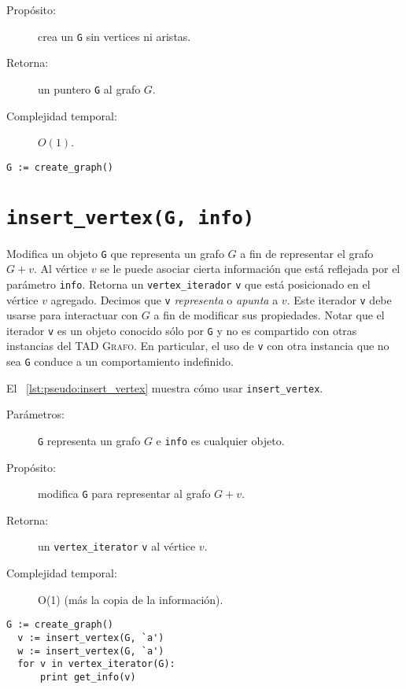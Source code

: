 \documentclass[%
    a4paper,%
    fontsize=12pt,%
    DIV=12,
    twoside,%
    openright,%
    titlepage=true,%
    headsepline,%
    toc=bibliography,%
    parskip=half,%
    cleardoublepage=empty,%
    headings=big,%
]{scrbook}
\makeatletter
\newcommand{\Grafo}{\textsc{Grafo}\xspace}
\newcommand{\Code}[1]{\lstinline[basicstyle={\ttfamily}]@#1@}
\makeatother
\begin{document}
\begin{description}
  \item [Propósito:] crea un \Code{G} sin vertices ni aristas.
  \item [Retorna:] un puntero \Code{G} al grafo $G$.
  \item [Complejidad temporal:]  $O(1)$.
\end{description}


\begin{lstlisting}[caption={Ejemplo de uso de \Code{create\_graph}},gobble=2,float=ht,label={lst:pseudo:create_graph},emph={create_graph}]
  G := create_graph()
\end{lstlisting}

\section{\texorpdfstring{\Code{insert_vertex(G, info)}}{insert\_vertex(G, info)}}
\label{sec:tad grafo:insert-vertex}

Modifica un objeto \Code{G} que representa un grafo $G$ a fin de representar el grafo $G + v$.  Al vértice $v$ se le puede asociar cierta información que está reflejada por el parámetro \Code{info}.  Retorna un \Code{vertex_iterador} \Code{v} que está posicionado en el vértice $v$ agregado.  Decimos que \Code{v} \emph{representa} o \emph{apunta} a $v$.  Este iterador \Code{v} debe usarse para interactuar con $G$ a fin de modificar sus propiedades.  Notar que el iterador \Code{v} es un objeto conocido sólo por \Code{G} y no es compartido con otras instancias del TAD \Grafo.  En particular, el uso de \Code{v} con otra instancia que no sea \Code{G} conduce a un comportamiento indefinido.

El \lstlistingname~\ref{lst:pseudo:insert_vertex} muestra cómo usar \Code{insert_vertex}.
  
\begin{description}
  \item [Parámetros:] \Code{G} representa un grafo $G$ e \Code{info} es cualquier objeto.
  \item [Propósito:] modifica \Code{G} para representar al grafo $G + v$.
  \item [Retorna:] un \Code{vertex_iterator} \Code{v} al vértice $v$.
  \item [Complejidad temporal:] O(1) (más la copia de la información).
\end{description}


\begin{lstlisting}[caption={Ejemplo de uso de \Code{insert_vertex} para imprimir ``aa''. Ver Sección~\ref{sec:tad grafo:vertex-iterator} para más información de \Code{vertex_iterator}.},gobble=2,float=ht,label={lst:pseudo:insert_vertex},emph={insert_vertex}]
  G := create_graph()
  v := insert_vertex(G, `a')
  w := insert_vertex(G, `a')
  for v in vertex_iterator(G):
      print get_info(v)
\end{lstlisting}
\end{document}
